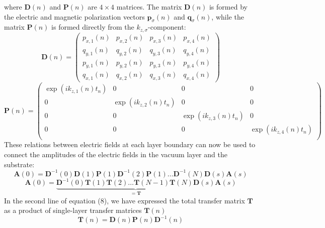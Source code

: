 \documentclass[11pt]{article}
\begin{document}
where $\mathbf{D}(n)$ and $\mathbf{P}(n)$ are $4\times 4$ matrices. The matrix $\mathbf{D}(n)$ is formed by the electric and magnetic polarization vectors $\mathbf{p}_{\sigma}(n)$ and $\mathbf{q}_{\sigma}(n)$, while the matrix $\mathbf{P}(n)$ is formed directly from the $k_{z,\sigma}$-component:
\begin{equation}
\mathbf{D}(n)=\left( \begin{array}{cccc} p_{x,1}(n) & p_{x,2}(n) & p_{x,3}(n) & p_{x,4}(n)\\
										 q_{y,1}(n) & q_{y,2}(n) & q_{y,3}(n) & q_{y,4}(n)\\
										 p_{y,1}(n) & p_{y,2}(n) & p_{y,3}(n) & p_{y,4}(n)\\
										 q_{x,1}(n) & q_{x,2}(n) & q_{x,3}(n) & q_{x,4}(n)
										 

\end{array}\right)
\end{equation}
\begin{equation}
\mathbf{P}(n)=\left( \begin{array}{cccc} \exp(ik_{z,1}(n)t_{n}) & 0 & 0 & 0\\
										 0 & \exp(ik_{z,2}(n)t_{n}) & 0 & 0\\
										 0 & 0 & \exp(ik_{z,3}(n)t_{n}) & 0\\
										 0 & 0 & 0 & \exp(ik_{z,4}(n)t_{n})\\
										 

\end{array}\right)

\end{equation}
These relations between electric fields at each layer boundary can now be used to connect the amplitudes of the electric fields in the vacuum layer and the substrate:
\begin{equation}
\mathbf{A}(0)=\mathbf{D}^{-1}(0)\mathbf{D}(1)\mathbf{P}(1)\mathbf{D}^{-1}(2)\mathbf{P}(1)\dots\mathbf{D}^{-1}(N)\mathbf{D}(s)\mathbf{A}(s)
\end{equation} 
\begin{displaymath}
 \mathbf{A}(0)=\underbrace{\mathbf{D}^{-1}(0)\mathbf{T}(1)\mathbf{T}(2)\dots \mathbf{T}(N-1)\mathbf{T}(N)\mathbf{D}(s)}_{=\mathbf{T}}\mathbf{A}(s)
\end{displaymath}
In the second line of equation (8), we have expressed the total transfer matrix $\mathbf{T}$ as a product of single-layer transfer matrices $\mathbf{T}(n)$
\begin{equation}
\mathbf{T}(n)=\mathbf{D}(n)\mathbf{P}(n)\mathbf{D}^{-1}(n)
\end{equation}
\end{document}
